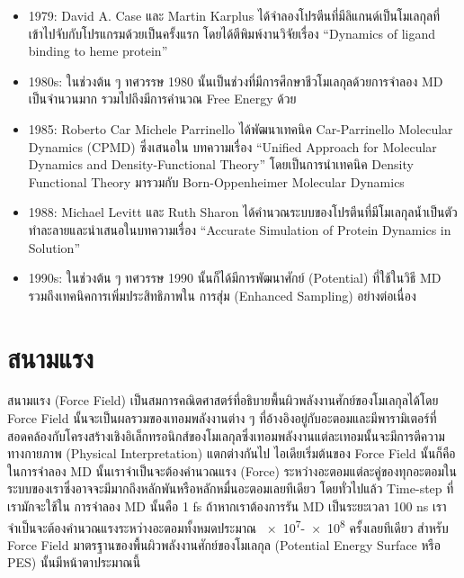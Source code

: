 \begin{itemize}[topsep=0pt,noitemsep]
  \item 1979: David A. Case และ Martin Karplus ได้จำลองโปรตีนที่มีลิแกนด์เป็นโมเลกุลที่เข้าไปจับกับโปรแกรมด้วยเป็นครั้งแรก
        โดยได้ตีพิมพ์งานวิจัยเรื่อง \enquote{Dynamics of ligand binding to heme protein}\autocite{case1979}

  \item 1980s: ในช่วงต้น ๆ ทศวรรษ 1980 นั้นเป็นช่วงที่มีการศึกษาชีวโมเลกุลด้วยการจำลอง MD เป็นจำนวนมาก รวมไปถึงมีการคำนวณ
        Free Energy ด้วย

  \item 1985: Roberto Car Michele Parrinello ได้พัฒนาเทคนิค Car-Parrinello Molecular Dynamics (CPMD) ซึ่งเสนอใน%
        บทความเรื่อง \enquote{Unified Approach for Molecular Dynamics and Density-Functional Theory}\autocite{car1985}
        โดยเป็นการนำเทคนิค Density Functional Theory มารวมกับ Born-Oppenheimer Molecular Dynamics

  \item 1988: Michael Levitt และ Ruth Sharon ได้คำนวณระบบของโปรตีนที่มีโมเลกุลน้ำเป็นตัวทำละลายและนำเสนอในบทความเรื่อง
        \enquote{Accurate Simulation of Protein Dynamics in Solution}\autocite{levitt1988}

  \item 1990s: ในช่วงต้น ๆ ทศวรรษ 1990 นั้นก็ได้มีการพัฒนาศักย์ (Potential) ที่ใช้ในวิธี MD รวมถึงเทคนิคการเพิ่มประสิทธิภาพใน%
        การสุ่ม (Enhanced Sampling) อย่างต่อเนื่อง
\end{itemize}

\section{สนามแรง}

สนามแรง (Force Field) เป็นสมการคณิตศาสตร์ที่อธิบายพื้นผิวพลังงานศักย์ของโมเลกุลได้โดย Force Field นั้นจะเป็นผลรวมของเทอมพลังงานต่าง ๆ
ที่อ้างอิงอยู่กับอะตอมและมีพารามิเตอร์ที่สอดคล้องกับโครงสร้างเชิงอิเล็กทรอนิกส์ของโมเลกุลซึ่งเทอมพลังงานแต่ละเทอมนั้นจะมีการตีความทางกายภาพ
(Physical Interpretation) แตกต่างกันไป ไอเดียเริ่มต้นของ Force Field นั้นก็คือในการจำลอง MD นั้นเราจำเป็นจะต้องคำนวณแรง (Force)
ระหว่างอะตอมแต่ละคู่ของทุกอะตอมในระบบของเราซึ่งอาจจะมีมากถึงหลักพันหรือหลักหมื่นอะตอมเลยทีเดียว โดยทั่วไปแล้ว Time-step ที่เรามักจะใช้ใน%
การจำลอง MD นั้นคือ 1 fs ถ้าหากเราต้องการรัน MD เป็นระยะเวลา 100 ns เราจำเป็นจะต้องคำนวณแรงระหว่างอะตอมทั้งหมดประมาณ
\num{e7}-\num{e8} ครั้งเลยทีเดียว สำหรับ Force Field มาตรฐานของพื้นผิวพลังงานศักย์ของโมเลกุล (Potential Energy Surface หรือ
PES) นั้นมีหน้าตาประมาณนี้

